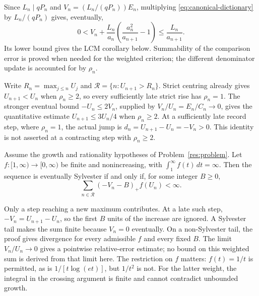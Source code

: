 \documentclass[11pt]{article}
\begin{document}
Since $L_n\mid qP_n$ and $V_n=(L_n/(qP_n))E_n$, multiplying
\eqref{eq:canonical-dictionary} by $L_n/(qP_n)$ gives, eventually,
\begin{equation}\label{eq:general-clearance-dictionary}
 0<V_n+\frac{L_n}{a_n}\left(\frac{a_n^2}{a_{n+1}}-1\right)
 \le\frac{L_n}{a_{n+1}}.
\end{equation}
Its lower bound gives the LCM corollary below. Summability of the
comparison error is proved when needed for the weighted criterion;
the different denominator update is accounted for by $\rho_n$.

Write $R_n=\max_{j\le n}U_j$ and
$\mathcal R=\{n:U_{n+1}>R_n\}$.  Strict centring already gives
$U_{n+1}<U_n$ when $\rho_n\ge2$, so every sufficiently late strict rise has
$\rho_n=1$.  The stronger eventual bound $-U_n\le2V_n$, supplied by
$V_n/U_n=E_n/C_n\to0$, gives the quantitative estimate
$U_{n+1}\le3U_n/4$ when $\rho_n\ge2$.
At a sufficiently late record step, where $\rho_n=1$, the actual jump is
$d_n=U_{n+1}-U_n=-V_n>0$. This identity is not asserted at a contracting
step with $\rho_n\ge2$.

\begin{theorem}\label{res:weightedrecord}
Assume the growth and rationality hypotheses of Problem~\ref{res:problem}.
Let $f:[1,\infty)\to[0,\infty)$ be finite and nonincreasing, with
$\int_1^\infty f(t)\,dt=\infty$. Then the sequence is eventually Sylvester
if and only if, for some integer $B\ge0$,
\[
 \sum_{n\in\mathcal R}(-V_n-B)_+f(U_n)<\infty.
\]
\end{theorem}

Only a step reaching a new maximum contributes. At a late such step,
$-V_n=U_{n+1}-U_n$, so the first $B$ units of the increase are ignored.
A Sylvester tail makes the sum finite because $V_n=0$ eventually.
On a non-Sylvester tail, the proof gives divergence for every admissible
$f$ and every fixed $B$. The limit $V_n/U_n\to0$ gives a pointwise
relative-error estimate; no bound on this weighted sum is derived from
that limit here. The restriction on $f$ matters:
$f(t)=1/t$ is permitted, as is $1/[t\log(et)]$, but $1/t^2$ is not.
For the latter weight, the integral in the crossing argument is finite
and cannot contradict unbounded growth.
\end{document}
